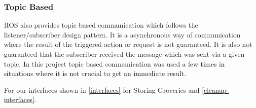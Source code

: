 \documentclass[main.tex]{subfiles}
\begin{document}
			\subsubsection{Topic Based}
			
			ROS also provides topic based communication which follows the listener/subscriber design pattern. It is a asynchronous way of communication where the result of the triggered action or request is not guaranteed. It is also not guaranteed that the subscriber received the message which was sent via a given topic. In this project topic based communication was used a few times in situations where it is not crucial to get an immediate result.  
		

		For our interfaces shown in \ref{interfaces} for Storing Groceries and \ref{cleanup-interfaces}. 


	\endgroup
\end{document}

